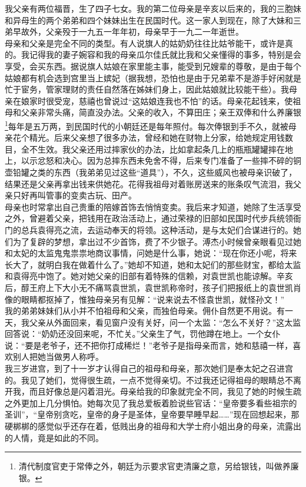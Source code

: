 我父亲有两位福晋，生了四子七女。我的第二位母亲是辛亥以后来的，我的三胞妹和异母生的两个弟弟和四个妹妹出生在民国时代。这一家人到现在，除了大妹和三弟早故外，父亲殁于一九五一年年初，母亲早于一九二一年逝世。\\

母亲和父亲是完全不同的类型。有人说旗人的姑奶奶往往比姑爷能干，或许是真的。我记得我的妻子婉容和我的母亲瓜尔佳氏就比我和父亲懂得的事多，特别是会享受，会买东西。据说旗人姑娘在家里能主事，能受到兄嫂辈的尊敬，是由于每个姑娘都有机会选到宫里当上嫔妃（据我想，恐怕也是由于兄弟辈不是游手好闲就是忙于宦务，管家理财的责任自然落在姊妹们身上，因此姑娘就比较能干些）。我母亲在娘家时很受宠，慈禧也曾说过“这姑娘连我也不怕”的话。母亲花起钱来，使祖母和父亲非常头痛，简直没办法。父亲的收入，不算田庄；亲王双俸和什么养廉银\footnote{清代制度官吏于常俸之外，朝廷为示要求官吏清廉之意，另给银钱，叫做养廉银。}每年是五万两，到民国时代的小朝廷还是每年照付。每次俸银到手不久，就被母亲花个精光。后来父亲想了很多办法，曾经和她在财物上分家，给她规定用钱数目，全不生效。我父亲还用过摔家伙的办法，比如拿起条几上的瓶瓶罐罐摔在地上，以示忿怒和决心。因为总摔东西未免舍不得，后来专门准备了一些摔不碎的铜壶铅罐之类的东西（我弟弟见过这些“道具”），不久，这些威风也被母亲识破了，结果还是父亲再拿出钱来供她花。花得我祖母对着账房送来的账条叹气流泪，我父亲只好再叫管事的变卖古玩、田产。\\

母亲也时常拿出自己贵重的陪嫁首饰去悄悄变卖。我后来才知道，她除了生活享受之外，曾避着父亲，把钱用在政治活动上，通过荣禄的旧部如民国时代步兵统领衙门的总兵袁得亮之流，去运动奉天的将领。这种活动，是与太妃们合谋进行的。她们为了复辟的梦想，拿出过不少首饰，费了不少银子。溥杰小时候曾亲眼看见过她和太妃的太监鬼鬼祟祟地商议事情，问她是什么事，她说：“现在你还小呢，将来长大了，就明白我在做着什么了。”她却不知道，她和太妃们的那些财宝，都给太监和袁得亮中饱了。她对她父亲的旧部有着特殊的信赖，对袁世凯也能谅解。辛亥后，醇王府上下大小无不痛骂袁世凯，袁世凯称帝时，孩子们把报纸上的袁世凯肖像的眼睛都抠掉了，惟独母亲另有见解：“说来说去不怪袁世凯，就怪孙文！”\\

我的弟弟妹妹们从小并不怕祖母和父亲，而独伯母亲。佣仆自然更不用说。有一天，我父亲从外面回来，看见窗户没有关好，问一个太监：“怎么不关好？”这太监回答说：“奶奶还没回来呢，不忙关。”父亲生了气，罚他蹲在地上。一个女仆说：“要是老爷子，还不把你打成稀烂！”老爷子是指母亲而言，她和慈禧一样，喜欢别人把她当做男人称呼。\\

我三岁进宫，到了十一岁才认得自己的祖母和母亲，那次她们是奉太妃之召进宫的。我见了她们，觉得很生疏，一点不觉得亲切。不过我还记得祖母的眼睛总不离开我，而且好像总是闪着泪光。母亲给我的印象就完全不同，我见了她的时候生疏之外更加上几分惧怕。她每次见了我总爱板着脸说些官话：“皇帝要多看些祖宗的圣训”，“皇帝别贪吃，皇帝的身子是圣体，皇帝要早睡早起……”现在回想起来，那硬梆梆的感觉似乎还存在着，低贱出身的祖母和大学士府小姐出身的母亲，流露出的人情，竟是如此的不同。\\